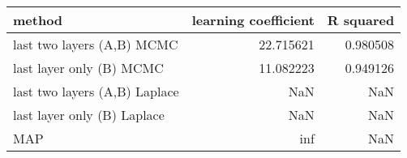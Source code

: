 \begin{tabular}{lrr}
\toprule
                        method &  learning coefficient &  R squared \\
\midrule
    last two layers (A,B) MCMC &             22.715621 &   0.980508 \\
      last layer only (B) MCMC &             11.082223 &   0.949126 \\
 last two layers (A,B) Laplace &                   NaN &        NaN \\
   last layer only (B) Laplace &                   NaN &        NaN \\
                           MAP &                   inf &        NaN \\
\bottomrule
\end{tabular}
